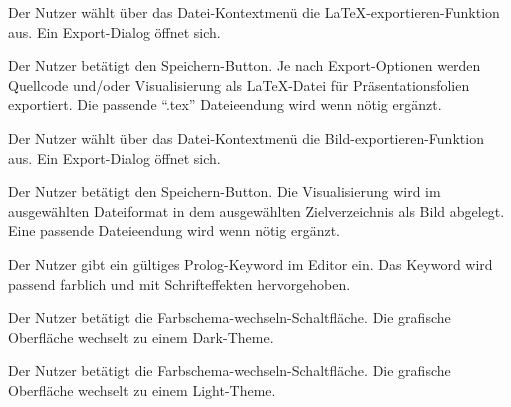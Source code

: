 \documentclass[parskip=full,11pt,twoside]{scrartcl}
\begin{document}
{Der Nutzer wählt über das Datei-Kontextmenü die LaTeX-exportieren-Funktion aus.}
{Ein Export-Dialog öffnet sich.}

{Der Nutzer betätigt den Speichern-Button.}
{Je nach Export-Optionen werden Quellcode und/oder Visualisierung als LaTeX-Datei für Präsentationsfolien exportiert. Die passende \enquote{.tex} Dateieendung wird wenn nötig ergänzt.}


{Der Nutzer wählt über das Datei-Kontextmenü die Bild-exportieren-Funktion aus.}
{Ein Export-Dialog öffnet sich.}

{Der Nutzer betätigt den Speichern-Button.}
{Die Visualisierung wird im ausgewählten Dateiformat in dem ausgewählten Zielverzeichnis als Bild abgelegt. Eine passende Dateieendung wird wenn nötig ergänzt.}



{Der Nutzer gibt ein gültiges Prolog-Keyword im Editor ein.}
{Das Keyword wird passend farblich und mit Schrifteffekten hervorgehoben.}



{Der Nutzer betätigt die Farbschema-wechseln-Schaltfläche.}
{Die grafische Oberfläche wechselt zu einem Dark-Theme.}

{Der Nutzer betätigt die Farbschema-wechseln-Schaltfläche.}
{Die grafische Oberfläche wechselt zu einem Light-Theme.}
\end{document}
